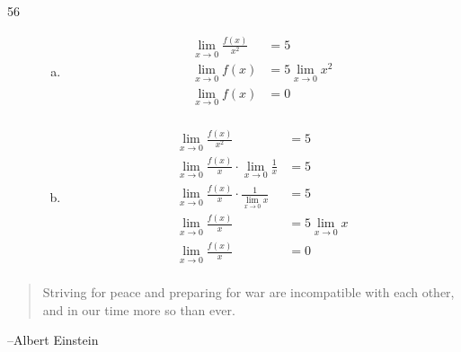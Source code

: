 \documentclass[letterpaper, landscape]{exam}
\begin{document}
\begin{description}
      \item[56]
        \begin{enumerate}[(a)]
          \item
            \begin{align*}
              \lim_{x \to 0} \frac{f(x)}{x^2} & = 5 \\
              \lim_{x \to 0} f(x)             & = 5 \lim_{x \to 0} x^2 \\
              \lim_{x \to 0} f(x)             & = \boxed{ 0 } \\
            \end{align*}

          \item 
            \begin{align*}
              \lim_{x \to 0} \frac{f(x)}{x^2}                                 & = 5 \\
              \lim_{x \to 0} \frac{f(x)}{x} \cdot \lim_{x \to 0} \frac{1}{x}  & = 5 \\
              \lim_{x \to 0} \frac{f(x)}{x} \cdot  \frac{1}{\lim_{x \to 0} x} & = 5 \\
              \lim_{x \to 0} \frac{f(x)}{x}                                   & = 5 \lim_{x \to 0} x \\
              \lim_{x \to 0} \frac{f(x)}{x}                                   & = \boxed{ 0 } \\
            \end{align*}

        \end{enumerate}
    \end{description}

  \else
    \vspace{11 cm}
    \begin{quote}
      \begin{em}
        Striving for peace and preparing for war are incompatible with each
        other, and in our time more so than ever. 
      \end{em}
    \end{quote}
    \hspace{1 cm} --Albert Einstein
  \fi
\end{document}

